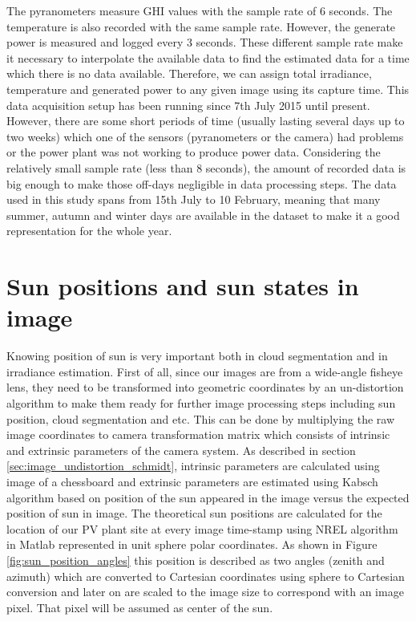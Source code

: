 The pyranometers measure GHI values with the sample rate of 6 seconds. The temperature is also recorded with the same sample rate. However, the generate power is measured and logged every 3 seconds. These different sample rate make it necessary to interpolate the available data to find the estimated data for a time which there is no data available. Therefore, we can assign total irradiance, temperature and generated power to any given image using its capture time. This data acquisition setup has been running since 7th July 2015 until present. However, there are some short periods of time (usually lasting several days up to two weeks) which one of the sensors (pyranometers or the camera) had problems or the power plant was not working to produce power data. Considering the relatively small sample rate (less than 8 seconds), the amount of recorded data is big enough to make those off-days negligible in data processing steps. The data used in this study spans from 15th July to 10 February, meaning that many summer, autumn and winter days are available in the dataset to make it a good representation for the whole year. 


\section{Sun positions and sun states in image}
\label{sec:sun-states}
Knowing position of sun is very important both in cloud segmentation and in irradiance estimation. First of all, since our images are from a wide-angle fisheye lens, they need to be transformed into geometric coordinates by an un-distortion algorithm to make them ready for further image processing steps including sun position, cloud segmentation and etc. This can be done by multiplying the raw image coordinates to camera transformation matrix which consists of intrinsic and extrinsic parameters of the camera system. As described in section \ref{sec:image_undistortion_schmidt}, intrinsic parameters are calculated using image of a chessboard\cite{fisheye_undistort} and extrinsic parameters are estimated using Kabsch algorithm\cite{Kabsch_alg} based on position of the sun appeared in the image versus the expected position of sun in image. The theoretical sun positions are calculated for the location of our PV plant site at every image time-stamp using NREL algorithm \cite{our_sun_position} in Matlab represented in unit sphere polar coordinates. As shown in Figure \ref{fig:sun_position_angles} this position is described as two angles (zenith and azimuth) which are converted to Cartesian coordinates using sphere to Cartesian conversion and later on are scaled to the image size to correspond with an image pixel. That pixel will be assumed as center of the sun.

